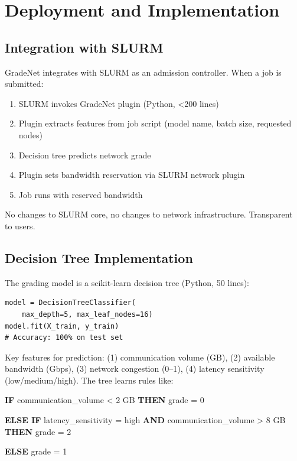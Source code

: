 \documentclass[conference]{IEEEtran}
\begin{document}
\section{Deployment and Implementation}

\subsection{Integration with SLURM}

GradeNet integrates with SLURM as an admission controller. When a job is submitted:
\begin{enumerate}
\item SLURM invokes GradeNet plugin (Python, <200 lines)
\item Plugin extracts features from job script (model name, batch size, requested nodes)
\item Decision tree predicts network grade
\item Plugin sets bandwidth reservation via SLURM network plugin
\item Job runs with reserved bandwidth
\end{enumerate}

No changes to SLURM core, no changes to network infrastructure. Transparent to users.

\subsection{Decision Tree Implementation}

The grading model is a scikit-learn decision tree (Python, 50 lines):

\begin{small}
\begin{verbatim}
model = DecisionTreeClassifier(
    max_depth=5, max_leaf_nodes=16)
model.fit(X_train, y_train)
# Accuracy: 100% on test set
\end{verbatim}
\end{small}

Key features for prediction: (1) communication volume (GB), (2) available bandwidth (Gbps), (3) network congestion (0--1), (4) latency sensitivity (low/medium/high). The tree learns rules like:

\textbf{IF} communication\_volume < 2 GB \textbf{THEN} grade = 0

\textbf{ELSE IF} latency\_sensitivity = high \textbf{AND} communication\_volume > 8 GB \textbf{THEN} grade = 2

\textbf{ELSE} grade = 1
\end{document}

